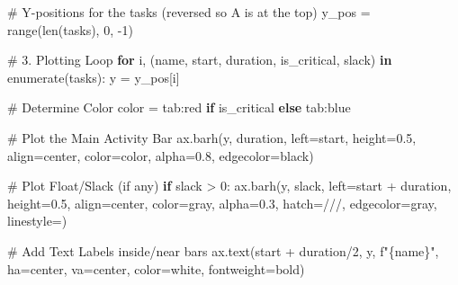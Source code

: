 \documentclass[
  letterpaper,
  DIV=11,
  numbers=noendperiod]{scrreprt}
\newenvironment{Shaded}{\begin{snugshade}}{\end{snugshade}}
\newcommand{\BuiltInTok}[1]{\textcolor[rgb]{0.00,0.23,0.31}{#1}}
\newcommand{\CommentTok}[1]{\textcolor[rgb]{0.37,0.37,0.37}{#1}}
\newcommand{\ControlFlowTok}[1]{\textcolor[rgb]{0.00,0.23,0.31}{\textbf{#1}}}
\newcommand{\DecValTok}[1]{\textcolor[rgb]{0.68,0.00,0.00}{#1}}
\newcommand{\FloatTok}[1]{\textcolor[rgb]{0.68,0.00,0.00}{#1}}
\newcommand{\KeywordTok}[1]{\textcolor[rgb]{0.00,0.23,0.31}{\textbf{#1}}}
\newcommand{\NormalTok}[1]{\textcolor[rgb]{0.00,0.23,0.31}{#1}}
\newcommand{\OperatorTok}[1]{\textcolor[rgb]{0.37,0.37,0.37}{#1}}
\newcommand{\SpecialCharTok}[1]{\textcolor[rgb]{0.37,0.37,0.37}{#1}}
\newcommand{\SpecialStringTok}[1]{\textcolor[rgb]{0.13,0.47,0.30}{#1}}
\newcommand{\StringTok}[1]{\textcolor[rgb]{0.13,0.47,0.30}{#1}}
\begin{document}
\begin{Shaded}
\begin{Highlighting}[]
\CommentTok{\# Y{-}positions for the tasks (reversed so A is at the top)}
\NormalTok{y\_pos }\OperatorTok{=} \BuiltInTok{range}\NormalTok{(}\BuiltInTok{len}\NormalTok{(tasks), }\DecValTok{0}\NormalTok{, }\OperatorTok{{-}}\DecValTok{1}\NormalTok{)}

\CommentTok{\# 3. Plotting Loop}
\ControlFlowTok{for}\NormalTok{ i, (name, start, duration, is\_critical, slack) }\KeywordTok{in} \BuiltInTok{enumerate}\NormalTok{(tasks):}
\NormalTok{    y }\OperatorTok{=}\NormalTok{ y\_pos[i]}
    
    \CommentTok{\# Determine Color}
\NormalTok{    color }\OperatorTok{=} \StringTok{\textquotesingle{}tab:red\textquotesingle{}} \ControlFlowTok{if}\NormalTok{ is\_critical }\ControlFlowTok{else} \StringTok{\textquotesingle{}tab:blue\textquotesingle{}}
    
    \CommentTok{\# Plot the Main Activity Bar}
\NormalTok{    ax.barh(y, duration, left}\OperatorTok{=}\NormalTok{start, height}\OperatorTok{=}\FloatTok{0.5}\NormalTok{, align}\OperatorTok{=}\StringTok{\textquotesingle{}center\textquotesingle{}}\NormalTok{, }
\NormalTok{            color}\OperatorTok{=}\NormalTok{color, alpha}\OperatorTok{=}\FloatTok{0.8}\NormalTok{, edgecolor}\OperatorTok{=}\StringTok{\textquotesingle{}black\textquotesingle{}}\NormalTok{)}
    
    \CommentTok{\# Plot Float/Slack (if any)}
    \ControlFlowTok{if}\NormalTok{ slack }\OperatorTok{\textgreater{}} \DecValTok{0}\NormalTok{:}
\NormalTok{        ax.barh(y, slack, left}\OperatorTok{=}\NormalTok{start }\OperatorTok{+}\NormalTok{ duration, height}\OperatorTok{=}\FloatTok{0.5}\NormalTok{, align}\OperatorTok{=}\StringTok{\textquotesingle{}center\textquotesingle{}}\NormalTok{, }
\NormalTok{                color}\OperatorTok{=}\StringTok{\textquotesingle{}gray\textquotesingle{}}\NormalTok{, alpha}\OperatorTok{=}\FloatTok{0.3}\NormalTok{, hatch}\OperatorTok{=}\StringTok{\textquotesingle{}///\textquotesingle{}}\NormalTok{, edgecolor}\OperatorTok{=}\StringTok{\textquotesingle{}gray\textquotesingle{}}\NormalTok{, linestyle}\OperatorTok{=}\StringTok{\textquotesingle{}{-}{-}\textquotesingle{}}\NormalTok{)}
        
    \CommentTok{\# Add Text Labels inside/near bars}
\NormalTok{    ax.text(start }\OperatorTok{+}\NormalTok{ duration}\OperatorTok{/}\DecValTok{2}\NormalTok{, y, }\SpecialStringTok{f"}\SpecialCharTok{\{}\NormalTok{name}\SpecialCharTok{\}}\SpecialStringTok{"}\NormalTok{, }
\NormalTok{            ha}\OperatorTok{=}\StringTok{\textquotesingle{}center\textquotesingle{}}\NormalTok{, va}\OperatorTok{=}\StringTok{\textquotesingle{}center\textquotesingle{}}\NormalTok{, color}\OperatorTok{=}\StringTok{\textquotesingle{}white\textquotesingle{}}\NormalTok{, fontweight}\OperatorTok{=}\StringTok{\textquotesingle{}bold\textquotesingle{}}\NormalTok{)}


\end{Highlighting}
\end{Shaded}
\end{document}
